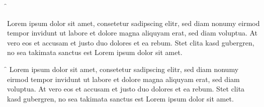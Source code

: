\documentclass{article}
\begin{document}
\iffalse
Commented stuff
Another \ifstuff here \fi
\ifaa \else \fi
\ifasd \fi \f \fii

Lorem ipsum dolor sit amet, consetetur sadipscing elitr, sed diam nonumy eirmod
tempor invidunt ut labore et dolore magna aliquyam erat, sed diam voluptua. At
vero eos et accusam et justo duo dolores et ea rebum. Stet clita kasd
gubergren, no sea takimata sanctus est Lorem ipsum dolor sit amet.
\fi

\iffalse
Commented stuff
Another \ifstuff here \fi
\ifaa \else \fi
\ifasd \fi \f \fii
\else
Lorem ipsum dolor sit amet, consetetur sadipscing elitr, sed diam nonumy eirmod
tempor invidunt ut labore et dolore magna aliquyam erat, sed diam voluptua. At
vero eos et accusam et justo duo dolores et ea rebum. Stet clita kasd
gubergren, no sea takimata sanctus est Lorem ipsum dolor sit amet.
\fi
\end{document}
